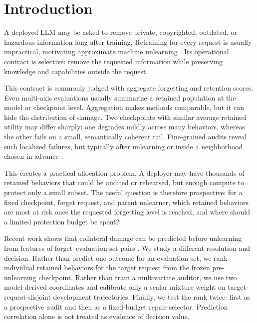 \section{Introduction}
\label{sec:intro}

A deployed LLM may be asked to remove private, copyrighted, outdated, or
hazardous information long after training. Retraining for every request is
usually impractical, motivating approximate machine unlearning
\cite{cao2015towards,bourtoule2021machine,liu2024rethinking}. Its operational
contract is selective: remove the requested information while preserving
knowledge and capabilities outside the request.

This contract is commonly judged with aggregate forgetting and retention
scores. Even multi-axis evaluations usually summarize a retained population at
the model or checkpoint level. Aggregation makes methods comparable, but it
can hide the distribution of damage. Two checkpoints with similar average
retained utility may differ sharply: one degrades mildly across many behaviors,
whereas the other fails on a small, semantically coherent tail. Fine-grained
audits reveal such localized failures, but typically after unlearning or
inside a neighborhood chosen in advance
\cite{chang2025retain,cheng2026entanglement,ko2025holes}.

This creates a practical allocation problem. A deployer may have thousands of
retained behaviors that could be audited or rehearsed, but enough compute to
protect only a small subset. The useful question is therefore prospective:
for a fixed checkpoint, forget request, and parent unlearner, which retained
behaviors are most at risk once the requested forgetting level is reached, and
where should a limited protection budget be spent?

Recent work shows that collateral damage can be predicted before unlearning
from features of forget--evaluation-set pairs
\cite{su2026preunlearn,su2026corruption}. We study a different resolution and
decision. Rather than predict one outcome for an evaluation set, we rank
individual retained behaviors for the target request from the frozen
pre-unlearning checkpoint. Rather than train a multivariate auditor, we use two
model-derived coordinates and calibrate only a scalar mixture weight on
target-request-disjoint development trajectories.
Finally, we test the rank twice: first as a prospective audit and then as a
fixed-budget repair selector. Prediction correlation alone is not treated as
evidence of decision value.

